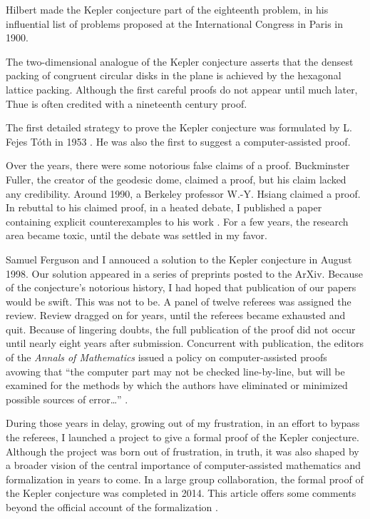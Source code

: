 \documentclass{amsart}
\begin{document}
Hilbert made the Kepler conjecture part of the eighteenth problem, in his
influential list of problems proposed at the International
Congress in Paris in 1900.

The two-dimensional analogue of the Kepler conjecture asserts that the
densest packing of congruent circular disks in the plane is achieved
by the hexagonal lattice packing.  Although the first careful
proofs do not appear until much later,
Thue is often credited with a
nineteenth century proof.

The first detailed strategy to prove the Kepler conjecture was
formulated by L. Fejes T\'oth in 1953 \cite{Fej53}.  He was also the first to
suggest a computer-assisted proof.

Over the years, there were some notorious false claims of a proof.
Buckminster Fuller, the creator of the geodesic dome, claimed a proof,
but his claim lacked any credibility.  Around 1990, a Berkeley
professor W.-Y. Hsiang claimed a proof.  In rebuttal to his claimed
proof, in a heated debate, I published a paper containing explicit
counterexamples to his work \cite{Hales:1994:MI}.  For a few years,
the research area became toxic, until the debate was settled in my
favor.

Samuel Ferguson and I annouced a solution to the Kepler conjecture in
August 1998.  Our solution appeared in a series of preprints
posted to the ArXiv.  Because of the conjecture's notorious history, I
had hoped that publication of our papers would be swift. This was not
to be.  A panel of twelve referees was assigned the review. Review
dragged on for years, until the referees became exhausted and quit.
Because of
lingering doubts, the full publication of the proof
did not occur until nearly eight years after submission.
%
Concurrent
with publication, the editors of the \emph{Annals of Mathematics}
issued a policy on computer-assisted proofs avowing that ``the
computer part may not be checked line-by-line, but will be examined
for the methods by which the authors have eliminated or minimized
possible sources of error\ldots'' \cite{annalsPolicy}.

During those years in delay, growing out of my frustration, in an
effort to bypass the referees, I launched a project to give a formal
proof of the Kepler conjecture.  Although the project was born out of
frustration, in truth, it was also shaped by a broader vision of the
central importance of computer-assisted mathematics and formalization
in years to come.  In a large group collaboration, the formal proof of
the Kepler conjecture was completed in 2014.
This article offers some comments beyond the official account of the
formalization  \cite{hales2017formal}.
\end{document}
